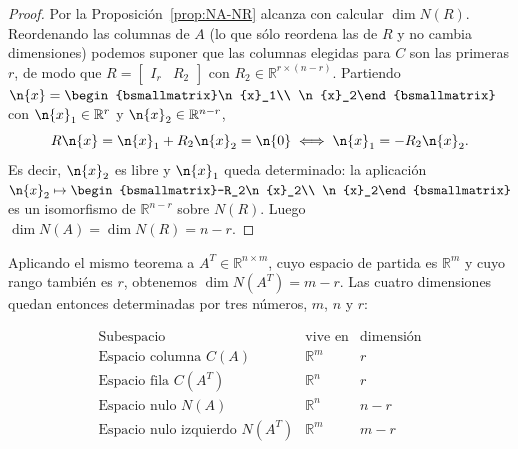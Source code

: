 \begin{proof}
Por la Proposición~\ref{prop:NA-NR} alcanza con calcular $\dim N(R)$.
Reordenando las columnas de $A$ (lo que sólo reordena las de $R$ y no cambia
dimensiones) podemos suponer que las columnas elegidas para $C$ son las primeras
$r$, de modo que $R = \begin{bmatrix} I_r & R_2\end{bmatrix}$ con
$R_2\in\mathbb{R}^{r\times(n-r)}$. Partiendo
$\n{x} = \begin{bsmallmatrix}\n{x}_1\\ \n{x}_2\end{bsmallmatrix}$ con
$\n{x}_1\in\mathbb{R}^r$ y $\n{x}_2\in\mathbb{R}^{n-r}$,
\[
R\n{x} = \n{x}_1 + R_2\n{x}_2 = \n{0}
\iff
\n{x}_1 = -R_2\n{x}_2 .
\]
Es decir, $\n{x}_2$ es libre y $\n{x}_1$ queda determinado: la aplicación
$\n{x}_2 \mapsto \begin{bsmallmatrix}-R_2\n{x}_2\\ \n{x}_2\end{bsmallmatrix}$ es
un isomorfismo de $\mathbb{R}^{n-r}$ sobre $N(R)$. Luego
$\dim N(A) = \dim N(R) = n-r$.
\end{proof}

Aplicando el mismo teorema a $A^T\in\mathbb{R}^{n\times m}$, cuyo espacio de
partida es $\mathbb{R}^m$ y cuyo rango también es $r$, obtenemos
$\dim N(A^T) = m-r$. Las cuatro dimensiones quedan entonces determinadas por
tres números, $m$, $n$ y $r$:

\[
\begin{array}{l|c|c}
\text{Subespacio} & \text{vive en} & \text{dimensión} \\
\hline
\text{Espacio columna } C(A) & \mathbb{R}^m & r \\[0.5ex]
\text{Espacio fila } C(A^T) & \mathbb{R}^n & r \\[0.5ex]
\text{Espacio nulo } N(A) & \mathbb{R}^n & n - r \\[0.5ex]
\text{Espacio nulo izquierdo } N(A^T) & \mathbb{R}^m & m - r
\end{array}
\]

